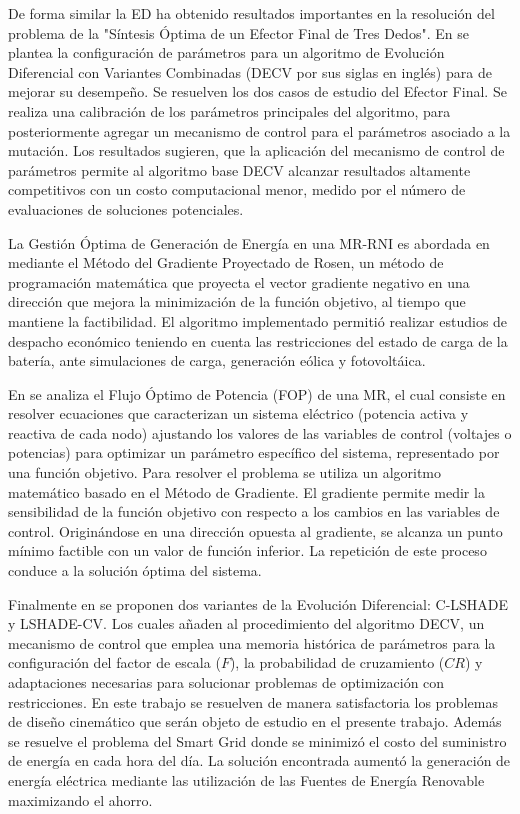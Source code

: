   De forma similar la ED ha obtenido resultados importantes en la resolución del problema de la "Síntesis Óptima de un Efector Final de Tres Dedos". En \cite{mezura-montes_dynamic_2015} se plantea la configuración de parámetros para un algoritmo de Evolución Diferencial con Variantes Combinadas (DECV por sus siglas en inglés) para de mejorar su desempeño. Se resuelven los dos casos de estudio del Efector Final. Se realiza una calibración de los parámetros principales del algoritmo, para posteriormente agregar un mecanismo de control para el parámetros asociado a la mutación. Los resultados sugieren, que la aplicación del mecanismo de control de parámetros permite al algoritmo base DECV alcanzar resultados altamente competitivos con un costo computacional menor, medido por el número de evaluaciones de soluciones potenciales.
  
  

 La Gestión Óptima de Generación de Energía en una MR-RNI es abordada en \cite{chica_leal_optimizacion_2015} mediante el Método del Gradiente Proyectado de Rosen, un método de programación matemática que proyecta el vector gradiente negativo  en una dirección que mejora la  minimización de la función objetivo, al tiempo que mantiene la factibilidad. El algoritmo implementado permitió realizar estudios de despacho económico teniendo en cuenta las restricciones del estado de carga de la batería, ante simulaciones de carga, generación eólica y fotovoltáica. 
 
 En \cite{heredia-ramirez_optimal_2014} se analiza el Flujo Óptimo de Potencia (FOP) de una MR, el cual consiste en resolver ecuaciones que caracterizan un sistema eléctrico (potencia activa y reactiva de cada nodo) ajustando los valores de las variables de control (voltajes o potencias) para optimizar un parámetro específico del sistema, representado por una función objetivo. Para resolver el problema se utiliza un algoritmo matemático basado en el Método de Gradiente. El gradiente permite medir la sensibilidad de la función objetivo con respecto a los cambios en las variables de control. Originándose en una dirección opuesta al gradiente, se alcanza un punto mínimo factible con un valor de función inferior. La repetición de este proceso conduce a la solución óptima del sistema.
 
Finalmente en \cite{zapata_zapata_control_2017}  se proponen dos variantes de la Evolución Diferencial: C-LSHADE y  LSHADE-CV. Los cuales añaden al procedimiento del algoritmo DECV, un mecanismo de control que emplea una memoria histórica de parámetros para la configuración del factor de escala ($F$), la probabilidad de cruzamiento ($CR$) y adaptaciones necesarias para solucionar problemas de optimización con restricciones. En este trabajo se resuelven de manera satisfactoria los problemas de diseño cinemático que serán objeto de estudio en el presente trabajo. Además se resuelve el problema del Smart Grid donde se minimizó el costo del suministro de energía en cada hora del día. La solución encontrada aumentó la generación de energía eléctrica mediante las utilización de las Fuentes de Energía Renovable maximizando el ahorro.
  
